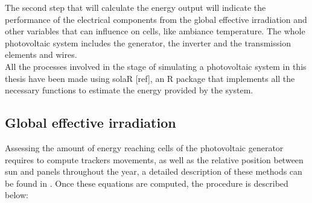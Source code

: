 The second step that will calculate the energy output will indicate the performance of the electrical components from the global effective irradiation and other variables that can influence on cells, like ambiance temperature. The whole photovoltaic system includes the generator, the inverter and the transmission elements and wires.\\



All the processes involved in the stage of simulating a photovoltaic system in this thesis have been made using solaR [ref], an R package that implements all the necessary functions to estimate the energy provided by the system.

\subsection{Global effective irradiation}

Assessing the amount of energy reaching cells of the photovoltaic generator requires to compute trackers movements, as well as the relative position between sun and panels throughout the year, a detailed description of these methods can be found in \citep{Perpinan.Marcos.ea2013}.  Once these equations are computed, the procedure is described below:\\

